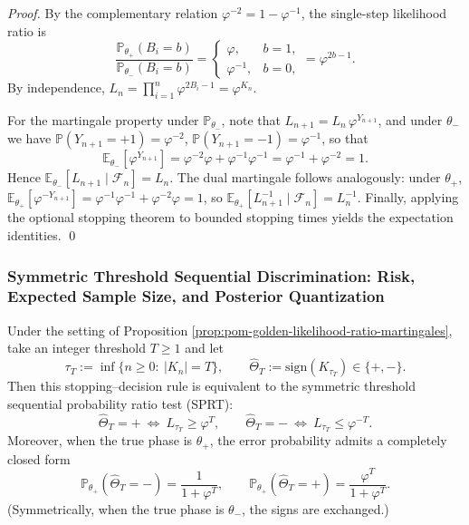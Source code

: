 \begin{proof}
By the complementary relation \(\varphi^{-2}=1-\varphi^{-1}\), the single-step likelihood ratio is
\[
\frac{\mathbb{P}_{\theta_+}(B_i=b)}{\mathbb{P}_{\theta_-}(B_i=b)}
=\begin{cases}
\varphi,& b=1,\\
\varphi^{-1},& b=0,
\end{cases}
=\varphi^{2b-1}.
\]
By independence,
\(
L_n=\prod_{i=1}^{n}\varphi^{2B_i-1}=\varphi^{K_n}
\).
\par
For the martingale property under \(\mathbb{P}_{\theta_-}\), note that
\(
L_{n+1}=L_n\,\varphi^{Y_{n+1}}
\), and under \(\theta_-\) we have \(\mathbb{P}(Y_{n+1}=+1)=\varphi^{-2}\), \(\mathbb{P}(Y_{n+1}=-1)=\varphi^{-1}\), so that
\[
\mathbb{E}_{\theta_-}[\varphi^{Y_{n+1}}]
=\varphi^{-2}\varphi+\varphi^{-1}\varphi^{-1}
=\varphi^{-1}+\varphi^{-2}
=1.
\]
Hence \(\mathbb{E}_{\theta_-}[L_{n+1}\mid\mathcal{F}_n]=L_n\).
The dual martingale follows analogously: under \(\theta_+\), \(\mathbb{E}_{\theta_+}[\varphi^{-Y_{n+1}}]=\varphi^{-1}\varphi^{-1}+\varphi^{-2}\varphi=1\), so \(\mathbb{E}_{\theta_+}[L_{n+1}^{-1}\mid\mathcal{F}_n]=L_n^{-1}\).
Finally, applying the optional stopping theorem to bounded stopping times yields the expectation identities. \qed
\end{proof}

\subsubsection{Symmetric Threshold Sequential Discrimination: Risk, Expected Sample Size, and Posterior Quantization}

\begin{theorem}\label{thm:pom-sprt-symmetric-threshold-error}
Under the setting of Proposition \ref{prop:pom-golden-likelihood-ratio-martingales}, take an integer threshold \(T\ge 1\) and let
\[
\tau_T:=\inf\{n\ge 0:\ |K_n|=T\},\qquad
\widehat\Theta_T:=\mathrm{sign}(K_{\tau_T})\in\{+,-\}.
\]
Then this stopping--decision rule is equivalent to the symmetric threshold sequential probability ratio test (SPRT):
\[
\widehat\Theta_T=+\ \Longleftrightarrow\ L_{\tau_T}\ge \varphi^T,\qquad
\widehat\Theta_T=-\ \Longleftrightarrow\ L_{\tau_T}\le \varphi^{-T}.
\]
Moreover, when the true phase is \(\theta_+\), the error probability admits a completely closed form
\[
\boxed{\;
\mathbb{P}_{\theta_+}(\widehat\Theta_T=-)=\frac{1}{1+\varphi^{T}},\qquad
\mathbb{P}_{\theta_+}(\widehat\Theta_T=+)=\frac{\varphi^{T}}{1+\varphi^{T}}.\;}
\]
(Symmetrically, when the true phase is \(\theta_-\), the signs are exchanged.)
\end{theorem}

